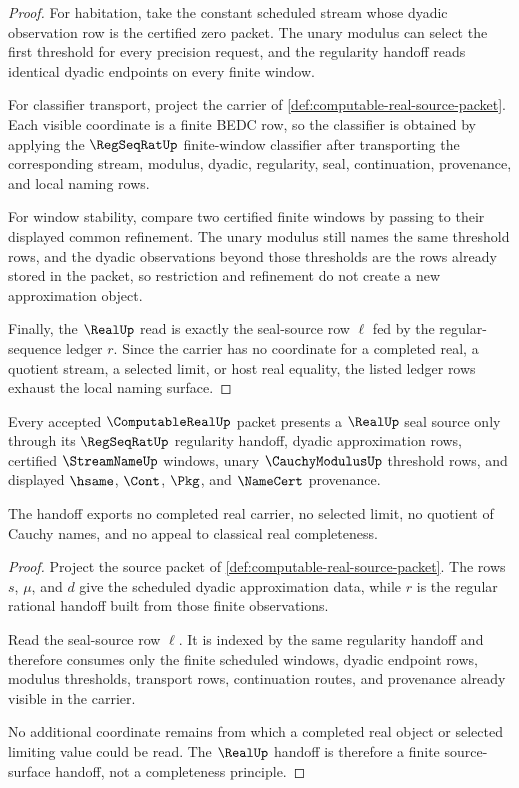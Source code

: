 \begin{proof}
For habitation, take the constant scheduled stream whose dyadic observation
row is the certified zero packet. The unary modulus can select the first
threshold for every precision request, and the regularity handoff reads
identical dyadic endpoints on every finite window.

For classifier transport, project the carrier of
\autoref{def:computable-real-source-packet}. Each visible coordinate is a
finite BEDC row, so the classifier is obtained by applying the
$\RegSeqRatUp$ finite-window classifier after transporting the corresponding
stream, modulus, dyadic, regularity, seal, continuation, provenance, and
local naming rows.

For window stability, compare two certified finite windows by passing to their
displayed common refinement. The unary modulus still names the same threshold
rows, and the dyadic observations beyond those thresholds are the rows already
stored in the packet, so restriction and refinement do not create a new
approximation object.

Finally, the $\RealUp$ read is exactly the seal-source row $\ell$ fed by the
regular-sequence ledger $r$. Since the carrier has no coordinate for a
completed real, a quotient stream, a selected limit, or host real equality,
the listed ledger rows exhaust the local naming surface.
\end{proof}

\begin{theorem}
\label{thm:computable-real-realup-handoff}
Every accepted $\ComputableRealUp$ packet presents a $\RealUp$ seal source
only through its $\RegSeqRatUp$ regularity handoff, dyadic approximation rows,
certified $\StreamNameUp$ windows, unary $\CauchyModulusUp$ threshold rows,
and displayed $\hsame$, $\Cont$, $\Pkg$, and $\NameCert$ provenance.

The handoff exports no completed real carrier, no selected limit, no quotient
of Cauchy names, and no appeal to classical real completeness.
\end{theorem}
\begin{proof}
Project the source packet of
\autoref{def:computable-real-source-packet}. The rows $s$, $\mu$, and $d$
give the scheduled dyadic approximation data, while $r$ is the regular
rational handoff built from those finite observations.

Read the seal-source row $\ell$. It is indexed by the same regularity handoff
and therefore consumes only the finite scheduled windows, dyadic endpoint
rows, modulus thresholds, transport rows, continuation routes, and provenance
already visible in the carrier.

No additional coordinate remains from which a completed real object or
selected limiting value could be read. The $\RealUp$ handoff is therefore a
finite source-surface handoff, not a completeness principle.
\end{proof}

